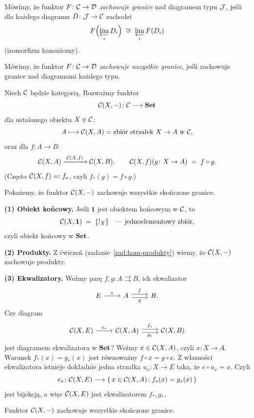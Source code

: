 \begin{definicja}
Mówimy, że funktor $F \colon \mathcal{C} \to \mathcal{D}$ \emph{zachowuje granice} nad diagramem typu $\mathcal{J}$, jeśli dla każdego diagramu $D \colon \mathcal{J} \to \mathcal{C}$ zachodzi
\[
F\Bigl(\varprojlim_i D_i\Bigr) \;\cong\; \varprojlim_i F(D_i)
\]
(izomorfizm kanoniczny).

Mówimy, że funktor $F \colon \mathcal{C} \to \mathcal{D}$ \emph{zachowuje wszystkie granice}, jeśli zachowuje granice nad diagramami każdego typu.
\end{definicja}

\begin{przyklad}
Niech $\mathcal{C}$ będzie kategorią. Rozważmy funktor
\[
\mathcal{C}(X, -) \colon \mathcal{C} \longrightarrow \mathbf{Set}
\]
dla ustalonego obiektu $X \in \mathcal{C}$:
\[
A \longmapsto \mathcal{C}(X, A) = \text{zbiór strzałek } X \to A \text{ w } \mathcal{C},
\]
oraz dla $f \colon A \to B$:
\[
\mathcal{C}(X, A) \xrightarrow{\;\mathcal{C}(X, f)\;} \mathcal{C}(X, B), \qquad \mathcal{C}(X, f)(g \colon X \to A) \;=\; f \circ g.
\]
(Często $\mathcal{C}(X, f) =: f_*$, czyli $f_*(g) = f \circ g$.)

Pokażemy, że funktor $\mathcal{C}(X, -)$ zachowuje wszystkie skończone granice.

\textbf{(1) Obiekt końcowy.} Jeśli $\mathbf{1}$ jest obiektem końcowym w $\mathcal{C}$, to
\[
\mathcal{C}(X, \mathbf{1}) \;=\; \{!_X\} \quad \text{--- jednoelementowy zbiór,}
\]
czyli obiekt końcowy w $\mathbf{Set}$.

\textbf{(2) Produkty.} Z ćwiczeń (zadanie~\ref{zad:hom-produkty}) wiemy, że $\mathcal{C}(X, -)$ zachowuje produkty.

\textbf{(3) Ekwalizatory.} Weźmy parę $f, g \colon A \rightrightarrows B$, ich ekwalizator
\[
\begin{tikzcd}
E \arrow[r, "e"] & A \arrow[r, shift left, "f"] \arrow[r, shift right, "g"'] & B.
\end{tikzcd}
\]
Czy diagram
\[
\begin{tikzcd}
\C(X, E) \arrow[r, "e_*"] & \C(X, A) \arrow[r, shift left, "f_*"] \arrow[r, shift right, "g_*"'] & \C(X, B)
\end{tikzcd}
\]
jest diagramem ekwalizatora w $\mathbf{Set}$? Weźmy $x \in \mathcal{C}(X, A)$, czyli $x \colon X \to A$. Warunek $f_*(x) = g_*(x)$ jest równoważny $f \circ x = g \circ x$. Z własności ekwalizatora istnieje dokładnie jedna strzałka $u_x \colon X \to E$ taka, że $e \circ u_x = x$. Czyli
\[
e_* \colon \mathcal{C}(X, E) \longrightarrow \{\, x \in \mathcal{C}(X, A) \colon f_*(x) = g_*(x) \,\}
\]
jest bijekcją, a więc $\mathcal{C}(X, E)$ jest ekwalizatorem $f_*, g_*$.
\end{przyklad}

\begin{wniosek}
Funktor $\mathcal{C}(X, -)$ zachowuje wszystkie skończone granice.
\end{wniosek}

